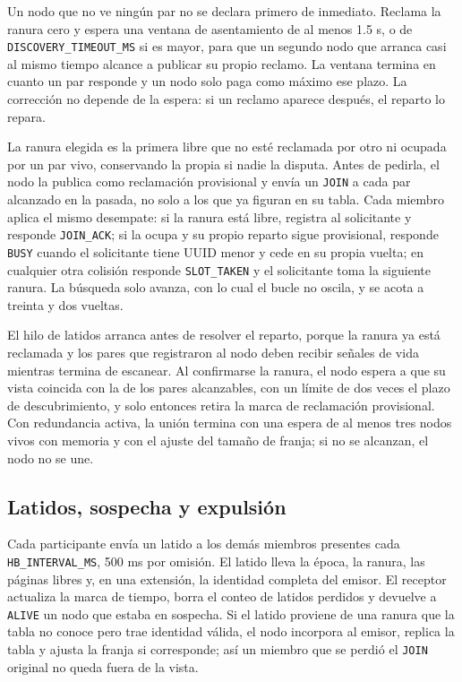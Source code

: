 Un nodo que no ve ningún par no se declara primero de inmediato. Reclama la ranura cero y espera una ventana de asentamiento de al menos 1.5 s, o de \texttt{DISCOVERY\_TIMEOUT\_MS} si es mayor, para que un segundo nodo que arranca casi al mismo tiempo alcance a publicar su propio reclamo. La ventana termina en cuanto un par responde y un nodo solo paga como máximo ese plazo. La corrección no depende de la espera: si un reclamo aparece después, el reparto lo repara.

La ranura elegida es la primera libre que no esté reclamada por otro ni ocupada por un par vivo, conservando la propia si nadie la disputa. Antes de pedirla, el nodo la publica como reclamación provisional y envía un \texttt{JOIN} a cada par alcanzado en la pasada, no solo a los que ya figuran en su tabla. Cada miembro aplica el mismo desempate: si la ranura está libre, registra al solicitante y responde \texttt{JOIN\_ACK}; si la ocupa y su propio reparto sigue provisional, responde \texttt{BUSY} cuando el solicitante tiene UUID menor y cede en su propia vuelta; en cualquier otra colisión responde \texttt{SLOT\_TAKEN} y el solicitante toma la siguiente ranura. La búsqueda solo avanza, con lo cual el bucle no oscila, y se acota a treinta y dos vueltas.

El hilo de latidos arranca antes de resolver el reparto, porque la ranura ya está reclamada y los pares que registraron al nodo deben recibir señales de vida mientras termina de escanear. Al confirmarse la ranura, el nodo espera a que su vista coincida con la de los pares alcanzables, con un límite de dos veces el plazo de descubrimiento, y solo entonces retira la marca de reclamación provisional. Con redundancia activa, la unión termina con una espera de al menos tres nodos vivos con memoria y con el ajuste del tamaño de franja; si no se alcanzan, el nodo no se une.

\subsection{Latidos, sospecha y expulsión}

Cada participante envía un latido a los demás miembros presentes cada \texttt{HB\_INTERVAL\_MS}, 500 ms por omisión. El latido lleva la época, la ranura, las páginas libres y, en una extensión, la identidad completa del emisor. El receptor actualiza la marca de tiempo, borra el conteo de latidos perdidos y devuelve a \texttt{ALIVE} un nodo que estaba en sospecha. Si el latido proviene de una ranura que la tabla no conoce pero trae identidad válida, el nodo incorpora al emisor, replica la tabla y ajusta la franja si corresponde; así un miembro que se perdió el \texttt{JOIN} original no queda fuera de la vista.


